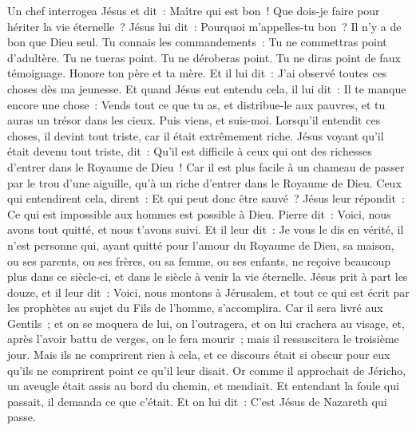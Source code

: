 \begin{multicols}{2}
Un chef interrogea Jésus et dit~: Maître qui est bon~! Que dois-je faire pour hériter la vie éternelle~?
Jésus lui dit~: Pourquoi m'appelles-tu bon~? Il n'y a de bon que Dieu seul.
Tu connais les commandements~: Tu ne commettras point d'adultère. Tu ne tueras point. Tu ne déroberas point. Tu ne diras point de faux témoignage. Honore ton père et ta mère.
Et il lui dit~: J'ai observé toutes ces choses dès ma jeunesse.
Et quand Jésus eut entendu cela, il lui dit~: Il te manque encore une chose~: Vends tout ce que tu as, et distribue-le aux pauvres, et tu auras un trésor dans les cieux. Puis viens, et suis-moi.
Lorsqu'il entendit ces choses, il devint tout triste, car il était extrêmement riche.
Jésus voyant qu'il était devenu tout triste, dit~: Qu'il est difficile à ceux qui ont des richesses d'entrer dans le Royaume de Dieu~!
Car il est plus facile à un chameau de passer par le trou d'une aiguille, qu'à un riche d'entrer dans le Royaume de Dieu.
Ceux qui entendirent cela, dirent~: Et qui peut donc être sauvé~?
Jésus leur répondit~: Ce qui est impossible aux hommes est possible à Dieu.
Pierre dit~: Voici, nous avons tout quitté, et nous t'avons suivi.
Et il leur dit~: Je vous le dis en vérité, il n'est personne qui, ayant quitté pour l'amour du Royaume de Dieu, sa maison, ou ses parents, ou ses frères, ou sa femme, ou ses enfants,
ne reçoive beaucoup plus dans ce siècle-ci, et dans le siècle à venir la vie éternelle.
Jésus prit à part les douze, et il leur dit~: Voici, nous montons à Jérusalem, et tout ce qui est écrit par les prophètes au sujet du Fils de l'homme, s'accomplira.
Car il sera livré aux Gentils~; et on se moquera de lui, on l'outragera, et on lui crachera au visage,
et, après l'avoir battu de verges, on le fera mourir~; mais il ressuscitera le troisième jour.
Mais ils ne comprirent rien à cela, et ce discours était si obscur pour eux qu'ils ne comprirent point ce qu'il leur disait.
Or comme il approchait de Jéricho, un aveugle était assis au bord du chemin, et mendiait.
Et entendant la foule qui passait, il demanda ce que c'était.
Et on lui dit~: C'est Jésus de Nazareth qui passe.

\end{multicols}
